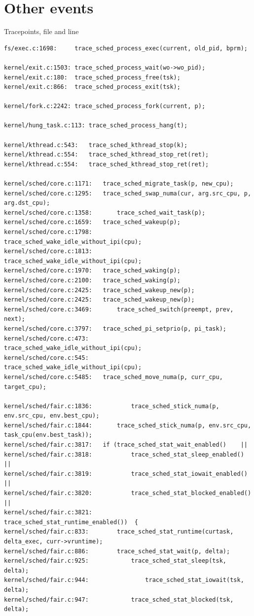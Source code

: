 \documentclass[10pt]{book}
\begin{document}
\section{Other events} %
\label{sec:other_events}
Tracepoints, file and line
\begin{verbatim}
fs/exec.c:1698:		trace_sched_process_exec(current, old_pid, bprm);

kernel/exit.c:1503:	trace_sched_process_wait(wo->wo_pid);
kernel/exit.c:180:	trace_sched_process_free(tsk);
kernel/exit.c:866:	trace_sched_process_exit(tsk);

kernel/fork.c:2242:	trace_sched_process_fork(current, p);

kernel/hung_task.c:113:	trace_sched_process_hang(t);

kernel/kthread.c:543:	trace_sched_kthread_stop(k);
kernel/kthread.c:554:	trace_sched_kthread_stop_ret(ret);
kernel/kthread.c:554:	trace_sched_kthread_stop_ret(ret);

kernel/sched/core.c:1171:	trace_sched_migrate_task(p, new_cpu);
kernel/sched/core.c:1295:	trace_sched_swap_numa(cur, arg.src_cpu, p, arg.dst_cpu);
kernel/sched/core.c:1358:		trace_sched_wait_task(p);
kernel/sched/core.c:1659:	trace_sched_wakeup(p);
kernel/sched/core.c:1798:			trace_sched_wake_idle_without_ipi(cpu);
kernel/sched/core.c:1813:		trace_sched_wake_idle_without_ipi(cpu);
kernel/sched/core.c:1970:	trace_sched_waking(p);
kernel/sched/core.c:2100:	trace_sched_waking(p);
kernel/sched/core.c:2425:	trace_sched_wakeup_new(p);
kernel/sched/core.c:2425:	trace_sched_wakeup_new(p);
kernel/sched/core.c:3469:		trace_sched_switch(preempt, prev, next);
kernel/sched/core.c:3797:	trace_sched_pi_setprio(p, pi_task);
kernel/sched/core.c:473:		trace_sched_wake_idle_without_ipi(cpu);
kernel/sched/core.c:545:		trace_sched_wake_idle_without_ipi(cpu);
kernel/sched/core.c:5485:	trace_sched_move_numa(p, curr_cpu, target_cpu);

kernel/sched/fair.c:1836:			trace_sched_stick_numa(p, env.src_cpu, env.best_cpu);
kernel/sched/fair.c:1844:		trace_sched_stick_numa(p, env.src_cpu, task_cpu(env.best_task));
kernel/sched/fair.c:3817:	if (trace_sched_stat_wait_enabled()    ||
kernel/sched/fair.c:3818:			trace_sched_stat_sleep_enabled()   ||
kernel/sched/fair.c:3819:			trace_sched_stat_iowait_enabled()  ||
kernel/sched/fair.c:3820:			trace_sched_stat_blocked_enabled() ||
kernel/sched/fair.c:3821:			trace_sched_stat_runtime_enabled())  {
kernel/sched/fair.c:833:		trace_sched_stat_runtime(curtask, delta_exec, curr->vruntime);
kernel/sched/fair.c:886:		trace_sched_stat_wait(p, delta);
kernel/sched/fair.c:925:			trace_sched_stat_sleep(tsk, delta);
kernel/sched/fair.c:944:				trace_sched_stat_iowait(tsk, delta);
kernel/sched/fair.c:947:			trace_sched_stat_blocked(tsk, delta);
\end{verbatim}
\end{document}
